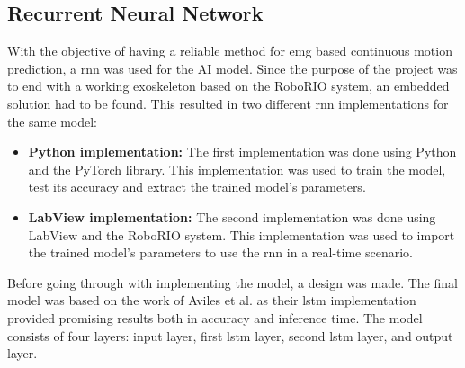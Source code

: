 \subsection{Recurrent Neural Network}
With the objective of having a reliable method for \acrshort{emg} based continuous motion prediction, a \acrshort{rnn} was used for the AI model. 
Since the purpose of the project was to end with a working exoskeleton based 
on the RoboRIO system, an embedded solution had to be found. This resulted in two different \acrshort{rnn} 
implementations for the same model:
\begin{itemize}

    \item \textbf{Python implementation:} The first implementation was done using Python and the PyTorch library. 
    This implementation was used to train the model, test its accuracy and extract the trained model's parameters.
    
    \item \textbf{LabView implementation:} The second implementation was done using LabView and the RoboRIO system. 
    This implementation was used to import the trained model's parameters to use the \acrshort{rnn} in a real-time scenario.

\end{itemize}

Before going through with implementing the model, a design was made. The final model was based on the work of Aviles et al. \cite{RNNEMG} 
as their \acrfull{lstm} implementation provided promising results both in accuracy and inference time. The model consists 
of four layers: input layer, first \acrshort{lstm} layer, second \acrshort{lstm} layer, and output layer.

